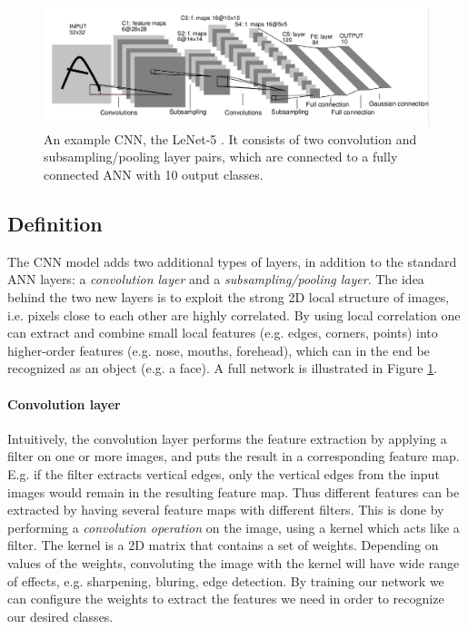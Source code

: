 \begin{figure}[h!]
  \centering
      \includegraphics[width=1.2\textwidth]{Figures/Background/convnet}
  \caption{An example CNN, the LeNet-5 \cite{LeCun1998}. It consists of two convolution and subsampling/pooling layer pairs, which are connected to a fully connected ANN with 10 output classes.}
  \label{fig_cnn}
\end{figure}

\subsection{Definition}

The CNN model adds two additional types of layers, in addition to the standard ANN layers: a \textit{convolution layer} and a \textit{subsampling/pooling layer}. The idea behind the two new layers is to exploit the strong 2D local structure of images, i.e. pixels close to each other are highly correlated. By using local correlation one can extract and combine small local features (e.g. edges, corners, points) into higher-order features (e.g. nose, mouths, forehead), which can in the end be recognized as an object (e.g. a face).  A full network is illustrated in Figure \ref{fig_cnn}.


\paragraph{Convolution layer}  \hfill \break
Intuitively, the convolution layer performs the feature extraction by applying a filter on one or more images, and puts the result in a corresponding feature map. E.g. if the filter extracts vertical edges, only the vertical edges from the input images would remain in the resulting feature map. Thus different features can be extracted by having several feature maps with different filters. This is done by performing a \textit{convolution operation} on the image, using a kernel which acts like a filter. The kernel is a 2D matrix that contains a set of weights. Depending on values of the weights, convoluting the image with the kernel will have wide range of effects, e.g. sharpening, bluring, edge detection. By training our network we can configure the weights to extract the features we need in order to recognize our desired classes. 

